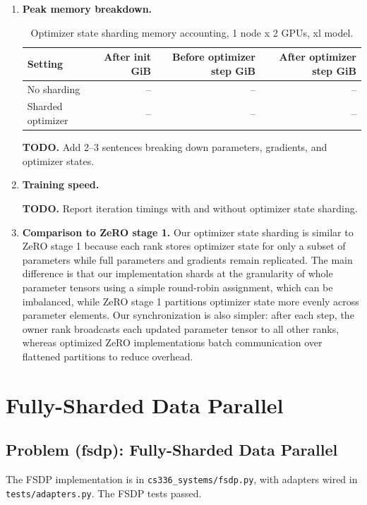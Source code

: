 \documentclass[11pt]{article}
\newcommand{\todoanswer}[1]{%
  \par\smallskip
  \noindent\colorbox{yellow!18}{%
    \parbox{\dimexpr\linewidth-2\fboxsep\relax}{\textbf{TODO.} #1}%
  }%
  \par\smallskip
}
\newcommand{\codepath}[1]{\texttt{#1}}
\begin{document}
\begin{enumerate}
  \item \textbf{Peak memory breakdown.}
  \begin{table}[H]
    \centering
    \caption{Optimizer state sharding memory accounting, 1 node x 2 GPUs, xl model.}
    \begin{tabular}{lrrr}
      \toprule
      Setting & After init GiB & Before optimizer step GiB & After optimizer step GiB \\
      \midrule
      No sharding & -- & -- & -- \\
      Sharded optimizer & -- & -- & -- \\
      \bottomrule
    \end{tabular}
  \end{table}
  \todoanswer{Add 2--3 sentences breaking down parameters, gradients, and optimizer states.}

  \item \textbf{Training speed.}
  \todoanswer{Report iteration timings with and without optimizer state sharding.}

  \item \textbf{Comparison to ZeRO stage 1.}
  Our optimizer state sharding is similar to ZeRO stage 1 because each rank stores optimizer state for only a subset of parameters while full parameters and gradients remain replicated. The main difference is that our implementation shards at the granularity of whole parameter tensors using a simple round-robin assignment, which can be imbalanced, while ZeRO stage 1 partitions optimizer state more evenly across parameter elements. Our synchronization is also simpler: after each step, the owner rank broadcasts each updated parameter tensor to all other ranks, whereas optimized ZeRO implementations batch communication over flattened partitions to reduce overhead.
\end{enumerate}

\section{Fully-Sharded Data Parallel}

\subsection{Problem (fsdp): Fully-Sharded Data Parallel}

The FSDP implementation is in \codepath{cs336\_systems/fsdp.py}, with adapters wired in \codepath{tests/adapters.py}. The FSDP tests passed.
\end{document}
